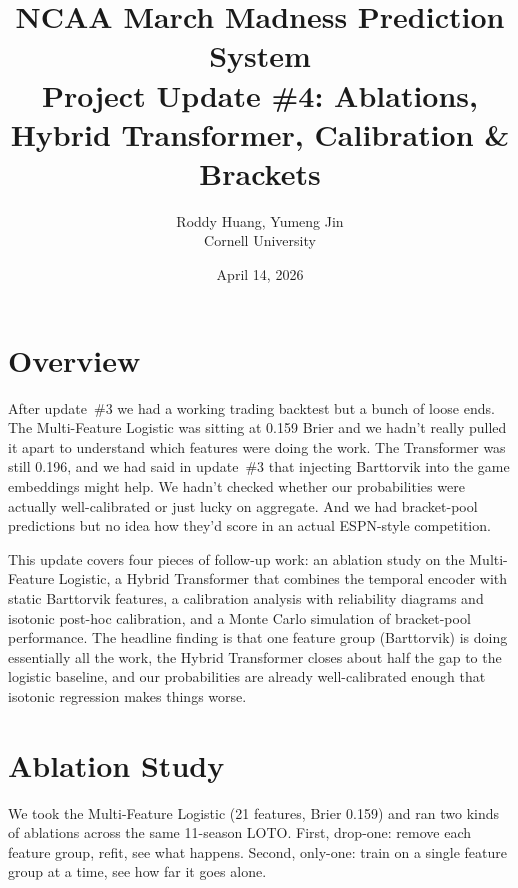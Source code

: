 \documentclass[11pt,a4paper]{article}
\title{%
    \vspace{-1cm}
    {\LARGE\bfseries NCAA March Madness Prediction System}\\[6pt]
    {\large Project Update \#4: Ablations, Hybrid Transformer, Calibration \& Brackets}
}
\author{
    Roddy Huang, Yumeng Jin \\
    Cornell University
}
\date{April 14, 2026}
\begin{document}
\maketitle
\thispagestyle{fancy}


\section{Overview}

After update~\#3 we had a working trading backtest but a bunch of loose ends. The Multi-Feature Logistic was sitting at 0.159 Brier and we hadn't really pulled it apart to understand which features were doing the work. The Transformer was still 0.196, and we had said in update~\#3 that injecting Barttorvik into the game embeddings might help. We hadn't checked whether our probabilities were actually well-calibrated or just lucky on aggregate. And we had bracket-pool predictions but no idea how they'd score in an actual ESPN-style competition.

This update covers four pieces of follow-up work: an ablation study on the Multi-Feature Logistic, a Hybrid Transformer that combines the temporal encoder with static Barttorvik features, a calibration analysis with reliability diagrams and isotonic post-hoc calibration, and a Monte Carlo simulation of bracket-pool performance. The headline finding is that one feature group (Barttorvik) is doing essentially all the work, the Hybrid Transformer closes about half the gap to the logistic baseline, and our probabilities are already well-calibrated enough that isotonic regression makes things worse.


\section{Ablation Study}

We took the Multi-Feature Logistic (21 features, Brier 0.159) and ran two kinds of ablations across the same 11-season LOTO. First, drop-one: remove each feature group, refit, see what happens. Second, only-one: train on a single feature group at a time, see how far it goes alone.
\end{document}
